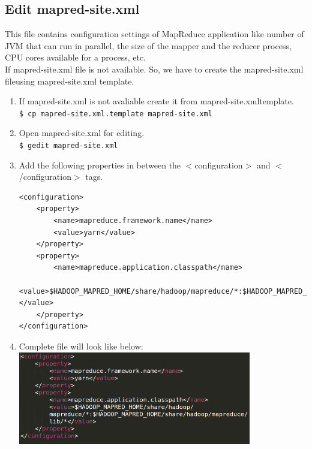 \documentclass[12pt]{article}%
\begin{document}
\subsection{Edit mapred-site.xml}
This file contains configuration settings of MapReduce application like number of JVM that can run in parallel, the size of the mapper and the reducer
process, CPU cores available for a process, etc.\\
If mapred-site.xml file is not available. So, we have to
create the mapred-site.xml fileusing mapred-site.xml template.
\begin{enumerate}
\item If mapred-site.xml is not avaliable create it from mapred-site.xmltemplate.\\
\lstinline{$ cp mapred-site.xml.template mapred-site.xml}
\item Open mapred-site.xml for editing.\\
\lstinline{$ gedit mapred-site.xml}
\item Add the following properties in between the $<$configuration$>$ and $<$/configuration$>$ tags.\\
\begin{lstlisting}
<configuration>
    <property>
        <name>mapreduce.framework.name</name>
        <value>yarn</value>
    </property>
    <property>
        <name>mapreduce.application.classpath</name>
        <value>$HADOOP_MAPRED_HOME/share/hadoop/mapreduce/*:$HADOOP_MAPRED_HOME/share/hadoop/mapreduce/lib/*</value>
    </property>
</configuration> 
\end{lstlisting}
\item Complete file will look like below:\\
\includegraphics[width=0.8\textwidth]{mapredxml.png}
\end{enumerate}
\end{document}

